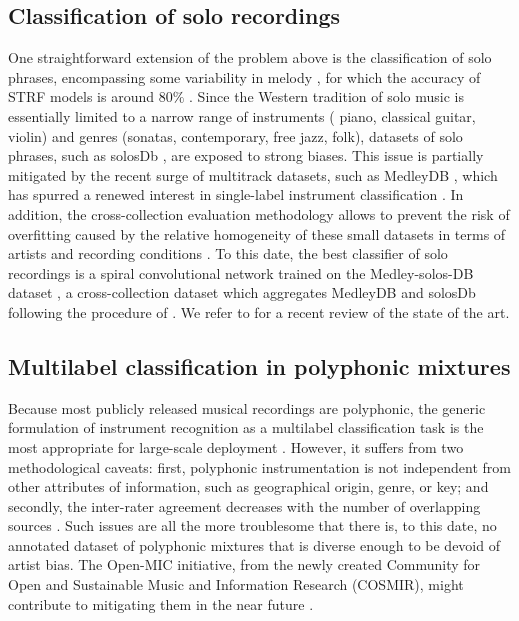 \subsection{Classification of solo recordings}
One straightforward extension of the problem above is the classification of solo phrases, encompassing some variability in melody \cite{krishna2004icassp}, for which the accuracy of STRF models is around $80\%$ \cite{patil2015eurasip}.
Since the Western tradition of solo music is essentially limited to a narrow range of instruments (\eg{} piano, classical guitar, violin) and genres (sonatas, contemporary, free jazz, folk), datasets of solo phrases, such as solosDb \cite{joder2009taslp}, are exposed to strong biases.
This issue is partially mitigated by the recent surge of multitrack datasets, such as MedleyDB \cite{bittner2014ismir}, which has spurred a renewed interest in single-label instrument classification \cite{yip2017ismir}.
In addition, the cross-collection evaluation methodology \cite{livshin2003ismir} allows to prevent the risk of overfitting caused by the relative homogeneity of these small datasets in terms of artists and recording conditions \cite{bogdanov2016ismir}.
To this date, the best classifier of solo recordings is a spiral convolutional network \cite{lostanlen2016ismir} trained on the Medley-solos-DB dataset \cite{lostanlen2018msdb}, \ie{} a cross-collection dataset which aggregates MedleyDB and solosDb following the procedure of \cite{donnelly2015icdmw}.
We refer to \cite{han2017taslp} for a recent review of the state of the art.

\subsection{Multilabel classification in polyphonic mixtures}
Because most publicly released musical recordings are polyphonic, the generic formulation of instrument recognition as a multilabel classification task is the most appropriate for large-scale deployment \cite{martins2007ismir,burred2009icassp}.
However, it suffers from two methodological caveats: first, polyphonic instrumentation is not independent from other attributes of information, such as geographical origin, genre, or key; and secondly, the inter-rater agreement decreases with the number of overlapping sources \cite[chapter 6]{fuhrmann2012phd}.
Such issues are all the more troublesome that there is, to this date, no  annotated dataset of polyphonic mixtures that is diverse enough to be devoid of artist bias.
The Open-MIC initiative, from the newly created Community for Open and Sustainable Music and Information Research (COSMIR), might contribute to mitigating them in the near future \cite{mcfee2016ismir}.

